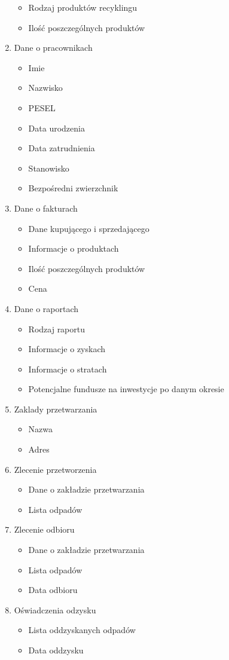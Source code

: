 \begin{enumerate}
	\begin{itemize}
		\item Rodzaj produktów recyklingu
		\item Ilość poszczególnych produktów
	\end{itemize}
	\item Dane o pracownikach
	\begin{itemize}
		\item Imie
		\item Nazwisko
		\item PESEL
		\item Data urodzenia
		\item Data zatrudnienia
		\item Stanowisko
		\item Bezpośredni zwierzchnik
	\end{itemize}
	\item Dane o fakturach 
	\begin{itemize}
		\item Dane kupującego i sprzedającego
		\item Informacje o produktach
		\item Ilość poszczególnych produktów
		\item Cena
	\end{itemize}
	\item Dane o raportach 
	\begin{itemize}
		\item Rodzaj raportu
		\item Informacje o zyskach
		\item Informacje o stratach
		\item Potencjalne fundusze na inwestycje po danym okresie
	\end{itemize}
	\item Zaklady przetwarzania
	\begin{itemize}
		\item Nazwa
		\item Adres 
	\end{itemize}  
	\item Zlecenie przetworzenia
	\begin{itemize}
		\item Dane o zakładzie przetwarzania
		\item Lista odpadów
	\end{itemize}
	\item Zlecenie odbioru
	\begin{itemize}
		\item Dane o zakładzie przetwarzania
		\item Lista odpadów
		\item Data odbioru
	\end{itemize}
	\item Oświadczenia odzysku
	\begin{itemize}
		\item Lista oddzyskanych odpadów
		\item Data oddzysku
	\end{itemize}
\end{enumerate}